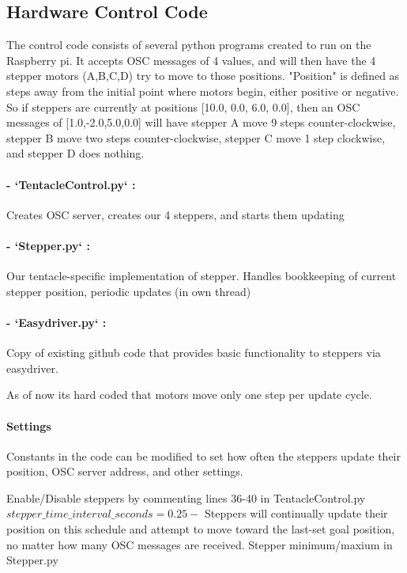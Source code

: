\documentclass[12pt,a4paper]{article}
\begin{document}
\subsection{Hardware Control Code}

The control code consists of several python programs created to run on the Raspberry pi. It accepts OSC messages of 4 values, and will then have the 4 stepper motors (A,B,C,D) try to move to those positions. "Position" is defined as steps away from the initial point where motors begin, either positive or negative. So if steppers are currently at positions [10.0, 0.0, 6.0, 0.0], then an OSC messages of [1.0,-2.0,5.0,0.0] will have stepper A move 9 steps counter-clockwise, stepper B move two steps counter-clockwise, stepper C move 1 step clockwise, and stepper D does nothing.

\paragraph{- `TentacleControl.py` :} Creates OSC server, creates our 4 steppers, and starts them updating
\paragraph{- `Stepper.py` :} Our tentacle-specific implementation of stepper. Handles bookkeeping of current stepper position, periodic updates (in own thread)
\paragraph{- `Easydriver.py` :} Copy of existing github code that provides basic functionality to steppers via easydriver.

As of now its hard coded that motors move only one step per update cycle.

\paragraph{Settings}
\hfill \break
Constants in the code can be modified to set how often the steppers update their position, OSC server address, and other settings.

\hfill \break
Enable/Disable steppers by commenting lines 36-40 in TentacleControl.py
\hfill \break \hfill \break
$stepper{\_}time{\_}interval{\_}seconds = 0.25-$ Steppers will continually update their position on this schedule and attempt to move toward the last-set goal position, no matter how many OSC messages are received.
\hfill \break \hfill \break
Stepper minimum/maxium in Stepper.py
\end{document}
